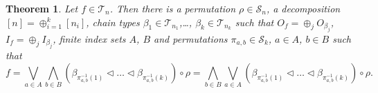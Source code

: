 \documentclass[12pt]{article}
\newtheorem{theorem}{Theorem}
\theoremstyle{definition}
\theoremstyle{remark}
\def\Te{\mathcal T}
\def\permut{\mathscr{S}}
\def\vtl{\vartriangleleft}
\begin{document}
\begin{theorem}\label{thm:structure}
Let  $f\in \Te_n$. Then there is a permutation $\rho\in \permut_n$, a decomposition
$[n]=\oplus_{i=1}^k[n_i]$, chain types 
$\beta_1\in \Te_{n_1}$,\dots, $\beta_k\in
\Te_{n_k}$ such that $O_f=\oplus_j O_{\beta_j}$, $I_f=\oplus_j I_{\beta_j}$, finite index sets $A$, $B$ and permutations $\pi_{a,b}\in
\permut_k$, $a\in A$, $b\in B$ such that 
\[
f=\bigvee_{a\in A}\bigwedge_{b\in B} (\beta_{\pi^{-1}_{a,b}(1)}\vtl \dots \vtl
\beta_{\pi^{-1}_{a,b}(k)})\circ \rho=\bigwedge_{b\in B}\bigvee_{a\in A}(\beta_{\pi^{-1}_{a,b}(1)}\vtl \dots \vtl
\beta_{\pi^{-1}_{a,b}(k)})\circ \rho.
\]
%
\end{theorem}
\end{document}
